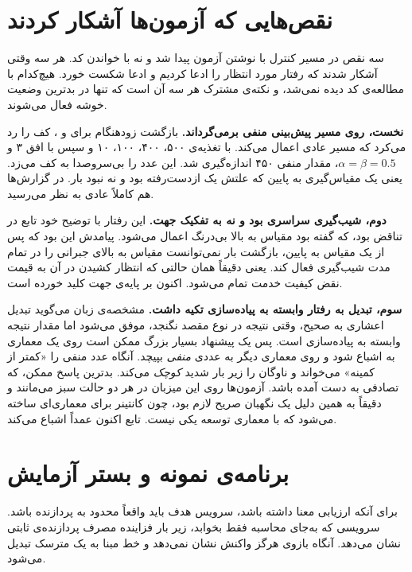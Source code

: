 \section{نقص‌هایی که آزمون‌ها آشکار کردند}
\label{sec:design-defects}

سه نقص در مسیر کنترل با نوشتن آزمون پیدا شد و نه با خواندن کد. هر سه وقتی آشکار شدند که
رفتار مورد انتظار را ادعا کردیم و ادعا شکست خورد. هیچ‌کدام با مطالعه‌ی کد دیده نمی‌شد، و
نکته‌ی مشترک هر سه آن است که تنها در بدترین وضعیت خوشه فعال می‌شوند.

\textbf{نخست،  روی مسیر  پیش‌بینی منفی برمی‌گرداند.} بازگشت زودهنگام
برای  و ، کف  را رد می‌کرد که مسیر عادی اعمال می‌کند. با
تغذیه‌ی ۵۰۰، ۴۰۰، ۱۰۰، ۱۰ و سپس  با افق ۳ و $\alpha = \beta = 0.5$، مقدار منفی ۴۵۰
اندازه‌گیری شد.  این عدد را بی‌سروصدا به  کف می‌زد. یعنی یک
مقیاس‌گیری به پایین که علتش یک  ازدست‌رفته بود و نه نبود بار. در گزارش‌ها هم
کاملاً عادی به نظر می‌رسید.

\textbf{دوم، شیب‌گیری سراسری بود و نه به تفکیک جهت.} این رفتار با توضیح خود تابع در تناقض
بود، که گفته بود مقیاس به بالا بی‌درنگ اعمال می‌شود. پیامدش
این بود که پس از یک مقیاس به پایین، بازگشت بار نمی‌توانست مقیاس به بالای جبرانی را در تمام
مدت شیب‌گیری فعال کند. یعنی دقیقاً همان حالتی که انتظار کشیدن در آن به قیمت نقض کیفیت خدمت
تمام می‌شود. اکنون بر پایه‌ی جهت کلید خورده است.

\textbf{سوم، تبدیل  به رفتار وابسته به پیاده‌سازی تکیه داشت.}
مشخصه‌ی زبان  می‌گوید تبدیل اعشاری به صحیح، وقتی نتیجه در نوع مقصد نگنجد، موفق می‌شود
اما مقدار نتیجه وابسته به پیاده‌سازی است. پس یک پیشنهاد بسیار بزرگ ممکن است روی یک معماری به
 اشباع شود و روی معماری دیگر به عددی \emph{منفی} بپیچد. آنگاه  عدد
منفی را «کمتر از کمینه» می‌خواند و ناوگان را زیر بار شدید \emph{کوچک} می‌کند. بدترین پاسخ
ممکن، که تصادفی به دست آمده باشد. آزمون‌ها روی این میزبان  در هر دو حالت سبز
می‌مانند و دقیقاً به همین دلیل یک نگهبان صریح لازم بود، چون کانتینر برای معماری‌ای ساخته
می‌شود که با معماری توسعه یکی نیست. تابع  اکنون عمداً اشباع می‌کند.

\section{برنامه‌ی نمونه و بستر آزمایش}
\label{sec:design-sampleapp}

برای آنکه ارزیابی معنا داشته باشد، سرویس هدف باید واقعاً محدود به پردازنده باشد. سرویسی که
به‌جای محاسبه فقط بخوابد، زیر بار فزاینده مصرف پردازنده‌ی ثابتی نشان می‌دهد. آنگاه بازوی
 هرگز واکنش نشان نمی‌دهد و خط مبنا به یک مترسک تبدیل می‌شود.

